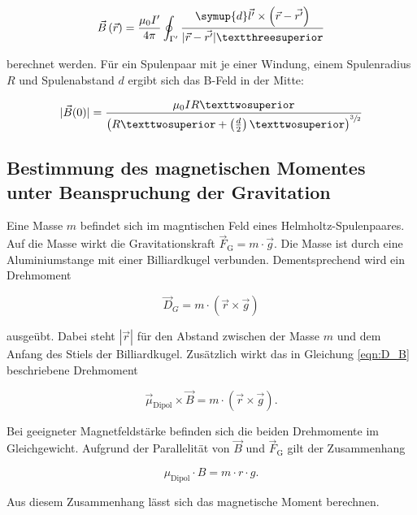 \begin{equation*}
    \vec{B}\left(\vec{r}\right) = \frac{\mu_{0}I'}{4\pi}\oint_{\Gamma'} \frac{\symup{d}\vec{l'} \times \left(\vec{r} - \vec{r'}\right)}{| \vec{r} - \vec{r'} |³}
\end{equation*}

\noindent berechnet werden. Für ein Spulenpaar mit je einer Windung, einem Spulenradius $R$ und Spulenabstand $d$ ergibt sich das B-Feld in der Mitte:

\begin{equation*}
    | \vec{B}(0) | = \frac{\mu_{0}IR²}{\left(R²+\left(\frac{d}{2}\right)²\right)^{\sfrac{3}{2}}}
\end{equation*}

\subsection{Bestimmung des magnetischen Momentes unter Beanspruchung der Gravitation}

\noindent Eine Masse $m$ befindet sich im magntischen Feld eines Helmholtz-Spulenpaares. Auf die Masse wirkt die Gravitationskraft 
$\vec{F}_\text{G} = m \cdot \vec{g}$. Die Masse ist durch eine Aluminiumstange mit einer Billiardkugel verbunden. Dementsprechend 
wird ein Drehmoment 

\begin{equation*}
    \vec{D}_{G} = m \cdot \left(\vec{r} \times \vec{g}\right)
\end{equation*}

\noindent ausgeübt. Dabei steht $| \vec{r} |$ für den Abstand zwischen der Masse $m$ und dem Anfang des Stiels der Billiardkugel.
Zusätzlich wirkt das in Gleichung \eqref{eqn:D_B} beschriebene Drehmoment 

\begin{equation*}
    \vec{\mu}_\text{Dipol} \times \vec{B} = m \cdot \left(\vec{r} \times \vec{g}\right).
\end{equation*}

\noindent Bei geeigneter Magnetfeldstärke befinden sich die beiden Drehmomente im Gleichgewicht. Aufgrund der Parallelität von $\vec{B}$ und
$\vec{F}_\text{G}$ gilt der Zusammenhang

\begin{equation}
\label{eqn:Gravitation}
    \mu_\text{Dipol} \cdot B = m \cdot r \cdot g.
\end{equation}

\noindent Aus diesem Zusammenhang lässt sich das magnetische Moment berechnen.

